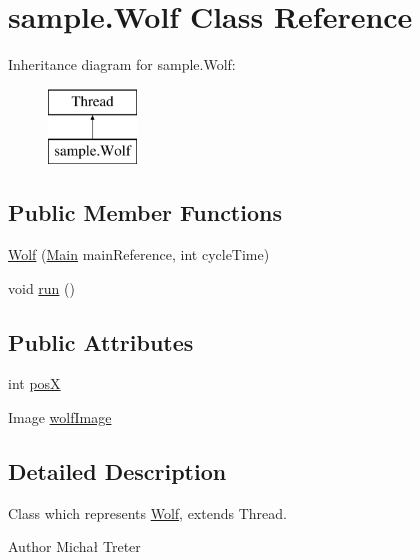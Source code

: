 \hypertarget{classsample_1_1_wolf}{}\section{sample.\+Wolf Class Reference}
\label{classsample_1_1_wolf}
Inheritance diagram for sample.\+Wolf\+:\begin{figure}[H]
\begin{center}
\leavevmode
\includegraphics[height=2.000000cm]{classsample_1_1_wolf}
\end{center}
\end{figure}
\subsection*{Public Member Functions}
\begin{DoxyCompactItemize}
\item 
\hyperlink{classsample_1_1_wolf_a190e576919c4c433f8289a442cc849e2}{Wolf} (\hyperlink{classsample_1_1_main}{Main} main\+Reference, int cycle\+Time)
\item 
void \hyperlink{classsample_1_1_wolf_a6b5c06d824289bd9e37b91fb5f94c4e0}{run} ()
\end{DoxyCompactItemize}
\subsection*{Public Attributes}
\begin{DoxyCompactItemize}
\item 
int \hyperlink{classsample_1_1_wolf_ae17bddbc1ec318716c546e2aed500dbe}{posX}
\item 
Image \hyperlink{classsample_1_1_wolf_a4a4ab45cd25ee5287c2f9a80d6b00a75}{wolf\+Image}
\end{DoxyCompactItemize}


\subsection{Detailed Description}
Class which represents \hyperlink{classsample_1_1_wolf}{Wolf}, extends Thread. \begin{DoxyAuthor}{Author}
Michał Treter 
\end{DoxyAuthor}


